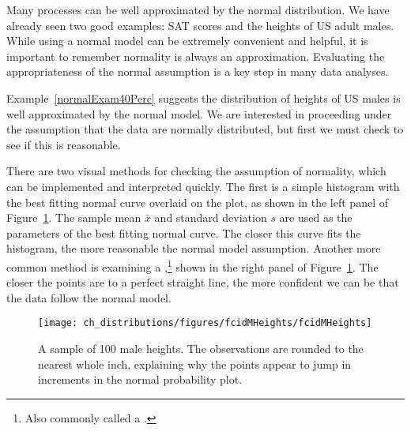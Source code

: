 Many processes can be well approximated by the normal distribution. We have already seen two good examples: SAT scores and the heights of US adult males. While using a normal model can be extremely convenient and helpful, it is important to remember normality is always an approximation. Evaluating the appropriateness of the normal assumption is a key step in many data analyses.


Example~\ref{normalExam40Perc} suggests the distribution of heights of US males is well approximated by the normal model. We are interested in proceeding under the assumption that the data are normally distributed, but first we must check to see if this is reasonable.

There are two visual methods for checking the assumption of normality, which can be implemented and interpreted quickly. The first is a simple histogram with the best fitting normal curve overlaid on the plot, as shown in the left panel of Figure~\ref{fcidMHeights}. The sample mean $\bar{x}$ and standard deviation $s$ are used as the parameters of the best fitting normal curve. The closer this curve fits the histogram, the more reasonable the normal model assumption. Another more common method is examining a ,\footnote{Also commonly called a .} shown in the right panel of Figure~\ref{fcidMHeights}. The closer the points are to a perfect straight line, the more confident we can be that the data follow the normal model.

\begin{figure}
\centering
\texttt{[image: ch\_distributions/figures/fcidMHeights/fcidMHeights]}
\caption{A sample of 100 male heights. The observations are rounded to the nearest whole inch, explaining why the points appear to jump in increments in the normal probability plot.}
\label{fcidMHeights}
\end{figure}

\textC{\newpage}

